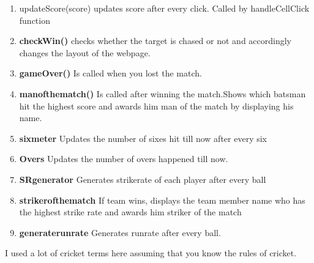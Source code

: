 \documentclass{article}
\begin{document}
\begin{enumerate}
\begin{itemize}
    \end{itemize}
    \item updateScore(score) updates score after every click. Called by handleCellClick function
    \item \textbf{checkWin()} checks whether the target is chased or not and accordingly changes the layout of the webpage.
    \item \textbf{gameOver()} Is called when you lost the match.
    \item \textbf{manofthematch()} Is called after winning the match.Shows which batsman hit the highest score and awards him man of the match by displaying his name. 
    \item \textbf{sixmeter} Updates the number of sixes hit till now after every six
    \item \textbf{Overs} Updates the number of overs happened till now.
    \item \textbf{SRgenerator} Generates strikerate of each player after every ball
    \item \textbf{strikerofthematch} If team wins, displays the team member name who has the highest strike rate and awards him striker of the match
    \item \textbf{generaterunrate} Generates runrate after every ball.
\end{enumerate}
I used a lot of cricket terms here assuming that you know the rules of cricket.
\end{document}
